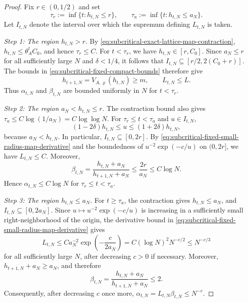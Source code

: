 \documentclass[11pt,reqno,a4paper]{article}
\begin{document}
\begin{proof}
  Fix $r\in(0,1/2)$ and set
  \begin{equation*}
    \tau_r:=\inf\{t:h_{t,N}\leq r\},
    \qquad
    \tau_a:=\inf\{t:h_{t,N}\leq a_N\}.
  \end{equation*}
  Let $I_{t,N}$ denote the interval over which the supremum defining
  $L_{t,N}$ is taken.

  \emph{Step 1: The region $h_{t,N}>r$.}
  By \cref{eq:subcritical-exact-lattice-map-contraction},
  $h_{t,N}\leq\theta_A^tC_0$, and hence $\tau_r\leq C$. For $t<\tau_r$, we
  have $h_{t,N}\in[r,C_0]$. Since $a_N\leq r$ for all sufficiently large $N$
  and $\delta<1/4$, it follows that
  $I_{t,N}\subseteq[r/2,2(C_0+r)]$. The bounds in
  \cref{eq:subcritical-fixed-compact-bounds} therefore give
  \begin{equation*}
    h_{t+1,N}=V_{A,\varrho}(h_{t,N})\geq m,
    \qquad
    L_{t,N}\leq L .
  \end{equation*}
  Thus $\alpha_{t,N}$ and $\beta_{t,N}$ are bounded uniformly in $N$ for
  $t<\tau_r$.

  \emph{Step 2: The region $a_N<h_{t,N}\leq r$.}
  The contraction bound also gives
  $\tau_a\leq C\log(1/a_N)=C\log\log N$. For $\tau_r\leq t<\tau_a$ and
  $u\in I_{t,N}$,
  \begin{equation*}
    (1-2\delta)h_{t,N}
    \leq
    u
    \leq
    (1+2\delta)h_{t,N},
  \end{equation*}
  because $a_N<h_{t,N}$. In particular, $I_{t,N}\subseteq[0,2r]$. By
  \cref{eq:subcritical-fixed-small-radius-map-derivative} and the boundedness
  of $u^{-2}\exp(-c/u)$ on $(0,2r]$, we have
  $L_{t,N}\leq C$. Moreover,
  \begin{equation*}
    \beta_{t,N}
    =
    \frac{h_{t,N}+a_N}{h_{t+1,N}+a_N}
    \leq
    \frac{2r}{a_N}
    \leq
    C\log N .
  \end{equation*}
  Hence $\alpha_{t,N}\leq C\log N$ for $\tau_r\leq t<\tau_a$.

  \emph{Step 3: The region $h_{t,N}\leq a_N$.}
  For $t\geq\tau_a$, the contraction gives $h_{t,N}\leq a_N$, and
  $I_{t,N}\subseteq[0,2a_N]$. Since
  $u\mapsto u^{-2}\exp(-c/u)$ is increasing in a sufficiently small
  right-neighborhood of the origin, the derivative bound in
  \cref{eq:subcritical-fixed-small-radius-map-derivative} gives
  \begin{equation*}
    L_{t,N}
    \leq
    Ca_N^{-2}\exp\left(-\frac{c}{2a_N}\right)
    =
    C(\log N)^2N^{-c/2}
    \leq
    N^{-c/3}
  \end{equation*}
  for all sufficiently large $N$, after decreasing $c>0$ if necessary.
  Moreover, $h_{t+1,N}+a_N\geq a_N$, and therefore
  \begin{equation*}
    \beta_{t,N}
    =
    \frac{h_{t,N}+a_N}{h_{t+1,N}+a_N}
    \leq2 .
  \end{equation*}
  Consequently, after decreasing $c$ once more,
  $\alpha_{t,N}=L_{t,N}\beta_{t,N}\leq N^{-c}$.


\end{proof}
\end{document}
